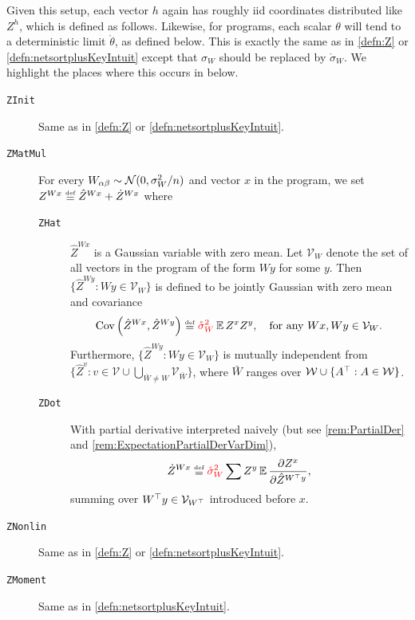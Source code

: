 \documentclass[main.tex]{subfiles}
\begin{document}
\begin{defn}\label{defn:ZVarDim}
    Given this setup, each vector $h$ again has roughly iid coordinates distributed like $Z^{h}$, which is defined as follows.
    Likewise, for \netsortplus{} programs, each scalar $\theta$ will tend to a deterministic limit $\mathring \theta$, as defined below.
This is exactly the same as in \cref{defn:Z} or \cref{defn:netsortplusKeyIntuit} except that $\sigma_W$ should be replaced by $\mathring \sigma_W$.
We highlight the places where this occurs in  below.
\begin{description}
\item [\texttt{ZInit}] Same as in \cref{defn:Z} or \cref{defn:netsortplusKeyIntuit}.
\item [\texttt{ZMatMul}] For every $W_{\alpha\beta}\sim\mathcal{N}(0,\sigma_{W}^{2}/n)$ and vector $x$ in the program, we set $Z^{Wx}\defeq \hat{Z}^{Wx}+\Zdot^{Wx}$ where
    \begin{description}
    \item [\texttt{ZHat}] {$\hat{Z}^{Wx}$} is a Gaussian variable with zero mean. Let $\mathcal V_W$ denote the set of all vectors in the program of the form $W y$ for some $y$.
    Then $\{\hat Z^{W y}: W y \in \mathcal V_W\}$ is defined to be jointly Gaussian with zero mean and covariance
    \[
    \Cov\left(\hat{Z}^{Wx},\hat{Z}^{W y}\right)\defeq \highlight{\mathring\sigma_{W}^{2}}\EV Z^{x}Z^{y},\quad\text{for any \ensuremath{Wx,W y\in\mathcal{V}_W}.}
    \]
    Furthermore, $\{\hat Z^{W y}: W y \in \mathcal V_W\}$ is mutually independent from $\{\hat Z^{v }: v \in \mathcal V \cup \bigcup_{\bar W \ne W} \mathcal V_{\bar W}\}$, where $\bar{W}$ ranges over $\mathcal{W}\cup\{A^{\top}:A\in\mathcal{W}\}$.
    \item [\texttt{ZDot}]
    With partial derivative interpreted naively (but see \cref{rem:PartialDer} and \ref{rem:ExpectationPartialDerVarDim}),
    \[\Zdot^{Wx}\defeq \highlight{\mathring\sigma_{W}^{2}}\sum Z^{y}\EV\frac{\partial Z^{x}}{\partial\hat{Z}^{W^{\trsp}y}},\]
    summing over $W^\top y \in \mathcal V_{W^\top}$ introduced before $x$.
    \end{description}
\item [\texttt{ZNonlin}] Same as in \cref{defn:Z} or \cref{defn:netsortplusKeyIntuit}.
\item [\texttt{ZMoment}] Same as in \cref{defn:netsortplusKeyIntuit}.
\end{description}
\end{defn}
\end{document}
